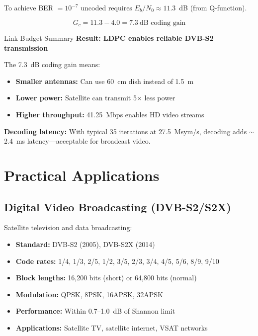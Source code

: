 To achieve BER $= 10^{-7}$ uncoded requires $E_b/N_0 \approx 11.3$~dB (from Q-function).

\begin{equation}
G_c = 11.3 - 4.0 = 7.3~\text{dB coding gain}
\end{equation}

\begin{calloutbox}[colback=black!8!white,colframe=black]{Link Budget Summary}
\textbf{Result: LDPC enables reliable DVB-S2 transmission}

The 7.3~dB coding gain means:
\begin{itemize}
\item \textbf{Smaller antennas:} Can use 60~cm dish instead of 1.5~m
\item \textbf{Lower power:} Satellite can transmit 5$\times$ less power
\item \textbf{Higher throughput:} 41.25~Mbps enables HD video streams
\end{itemize}

\textbf{Decoding latency:} With typical 35 iterations at 27.5~Msym/s, decoding adds $\sim$2.4~ms latency---acceptable for broadcast video.
\end{calloutbox}

\section{Practical Applications}

\subsection{Digital Video Broadcasting (DVB-S2/S2X)}

Satellite television and data broadcasting:
\begin{itemize}
\item \textbf{Standard:} DVB-S2 (2005), DVB-S2X (2014)
\item \textbf{Code rates:} 1/4, 1/3, 2/5, 1/2, 3/5, 2/3, 3/4, 4/5, 5/6, 8/9, 9/10
\item \textbf{Block lengths:} 16,200 bits (short) or 64,800 bits (normal)
\item \textbf{Modulation:} QPSK, 8PSK, 16APSK, 32APSK
\item \textbf{Performance:} Within 0.7--1.0~dB of Shannon limit
\item \textbf{Applications:} Satellite TV, satellite internet, VSAT networks
\end{itemize}

